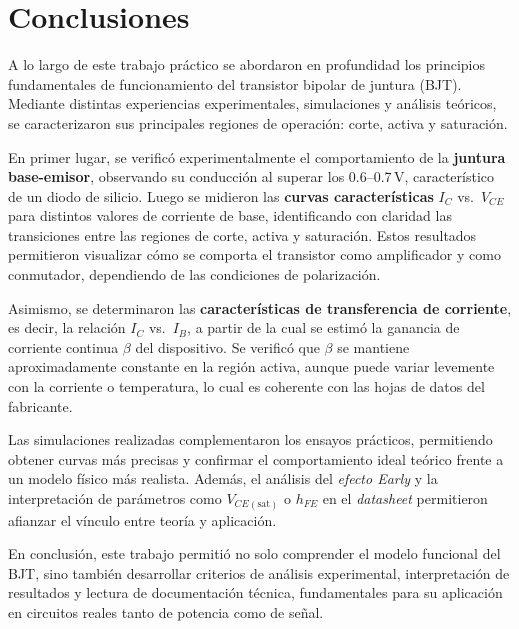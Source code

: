 \chapter{Conclusiones}

A lo largo de este trabajo práctico se abordaron en profundidad los principios fundamentales de funcionamiento del transistor bipolar de juntura (BJT). Mediante distintas experiencias experimentales, simulaciones y análisis teóricos, se caracterizaron sus principales regiones de operación: corte, activa y saturación.

En primer lugar, se verificó experimentalmente el comportamiento de la \textbf{juntura base-emisor}, observando su conducción al superar los 0.6--0.7\,V, característico de un diodo de silicio. Luego se midieron las \textbf{curvas características} $I_C$ vs.\ $V_{CE}$ para distintos valores de corriente de base, identificando con claridad las transiciones entre las regiones de corte, activa y saturación. Estos resultados permitieron visualizar cómo se comporta el transistor como amplificador y como conmutador, dependiendo de las condiciones de polarización.

Asimismo, se determinaron las \textbf{características de transferencia de corriente}, es decir, la relación $I_C$ vs.\ $I_B$, a partir de la cual se estimó la ganancia de corriente continua $\beta$ del dispositivo. Se verificó que $\beta$ se mantiene aproximadamente constante en la región activa, aunque puede variar levemente con la corriente o temperatura, lo cual es coherente con las hojas de datos del fabricante.

Las simulaciones realizadas complementaron los ensayos prácticos, permitiendo obtener curvas más precisas y confirmar el comportamiento ideal teórico frente a un modelo físico más realista. Además, el análisis del \textit{efecto Early} y la interpretación de parámetros como $V_{CE(\text{sat})}$ o $h_{FE}$ en el \textit{datasheet} permitieron afianzar el vínculo entre teoría y aplicación.

En conclusión, este trabajo permitió no solo comprender el modelo funcional del BJT, sino también desarrollar criterios de análisis experimental, interpretación de resultados y lectura de documentación técnica, fundamentales para su aplicación en circuitos reales tanto de potencia como de señal.
